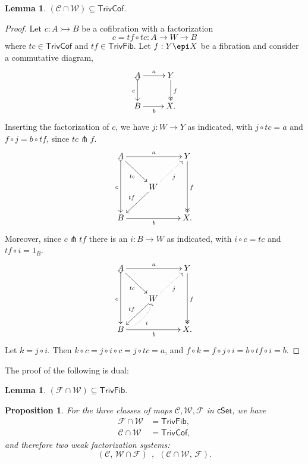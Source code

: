 \documentclass[11pt]{article}
\newcommand{\cSet}{\ensuremath{\mathsf{cSet}}}
\newcommand{\mono}{\ensuremath{\rightarrowtail}}
\newcommand{\ra}{\ensuremath{\rightarrow}}
\newtheorem{proposition}[theorem]{Proposition}
\newtheorem{lemma}[theorem]{Lemma}
\theoremstyle{remark}
\theoremstyle{definition}
\begin{document}
\begin{lemma}
$(\mathcal{C} \cap \mathcal{W})  \subseteq \mathsf{TrivCof}.$
\end{lemma}
\begin{proof}
Let $c : A\mono B$ be a cofibration with a factorization $$c = tf\circ tc : A \ra W\ra B$$ where $tc\in\mathsf{TrivCof}$ and $tf\in\mathsf{TrivFib}$.  Let $f:Y\epi X$ be a fibration and consider a commutative diagram,
\begin{equation*}%
\xymatrix{
A \ar@{>->}[d]_{c} \ar[r]^-{a}  & Y \ar@{>>}[d]^{f} \\
B \ar[r]_{b} &  X.
}
\end{equation*}
Inserting the factorization of $c$, we have $j : W\to Y$ as indicated, with $j\circ tc = a$ and $f\circ j = b\circ tf$, since $tc \pitchfork f$.
\begin{equation*}%
\xymatrix{
A \ar@{>->}[dd]_{c} \ar[rd]_{tc} \ar[rr]^-{a}  && Y \ar@{>>}[dd]^{f} \\
& W \ar[ld]_{tf} \ar@{.>}[ru]_{j} & \\
B \ar[rr]_{b} &&  X.
}
\end{equation*}
Moreover, since $c\pitchfork tf$ there is an $i : B \ra W$ as indicated, with $i\circ c = tc$ and $tf\circ i = 1_B$.
\begin{equation*}%
\xymatrix{
A \ar@{>->}[dd]_{c} \ar[rd]_{tc} \ar[rr]^-{a}  && Y \ar@{>>}[dd]^{f} \\
& W \ar[ld]_{tf} \ar@{.>}[ru]_{j} & \\
B \ar[rr]_{b} \ar@{.>}@/_2ex/[ru]_--{i} &&  X.
}
\end{equation*}
Let $k = j\circ i$. Then $k \circ c = j\circ i \circ c = j \circ tc = a$, and $f \circ k = f\circ j\circ i = b\circ tf\circ i = b$.
\end{proof}

The proof of the following is dual:
\begin{lemma}
$(\mathcal{F} \cap \mathcal{W})  \subseteq \mathsf{TrivFib}.$
\end{lemma}

\begin{proposition}\label{prop:FWC}
For the three classes of maps $\mathcal{C}, \mathcal{W}, \mathcal{F}$ in \cSet, we have 
\begin{align*}
\mathcal{F}\cap\mathcal{W} &= \mathsf{TrivFib}, \\
\mathcal{C}\cap\mathcal{W} &= \mathsf{TrivCof},
\end{align*}
and therefore two weak factorization systems:
\[
(\mathcal{C},\, \mathcal{W}\cap\mathcal{F})\ \ ,\ \ (\mathcal{C}\cap\mathcal{W},\, \mathcal{F}).
\]
\end{proposition}
\end{document}
